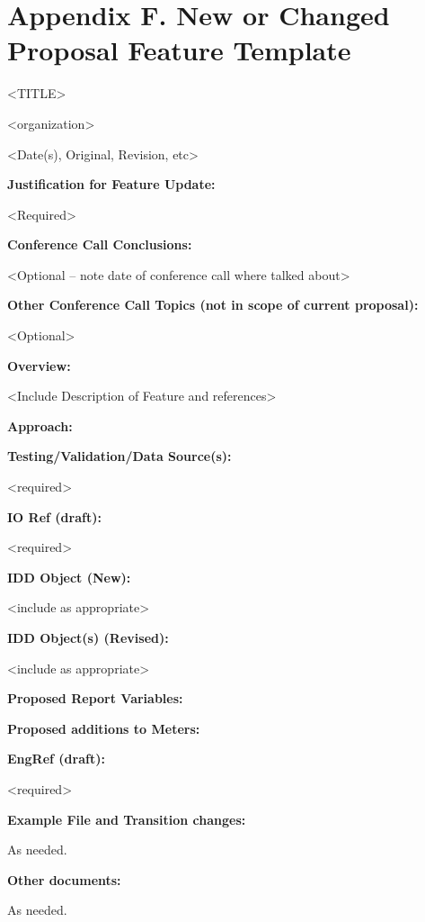 \chapter{Appendix F. New or Changed Proposal Feature Template}\label{appendix-f.-new-or-changed-proposal-feature-template}

\textless{}TITLE\textgreater{}

\textless{}organization\textgreater{}

\textless{}Date(s), Original, Revision, etc\textgreater{}

\textbf{Justification for Feature Update:}

\textless{}Required\textgreater{}

\textbf{Conference Call Conclusions:}

\textless{}Optional -- note date of conference call where talked about\textgreater{}

\textbf{Other Conference Call Topics (not in scope of current proposal):}

\textless{}Optional\textgreater{}

\textbf{Overview:}

\textless{}Include Description of Feature and references\textgreater{}

\textbf{Approach:}

\textbf{Testing/Validation/Data Source(s):}

\textless{}required\textgreater{}

\textbf{IO Ref (draft):}

\textless{}required\textgreater{}

\textbf{IDD Object (New):}

\textless{}include as appropriate\textgreater{}

\textbf{IDD Object(s) (Revised):}

\textless{}include as appropriate\textgreater{}

\textbf{Proposed Report Variables:}

\textbf{Proposed additions to Meters:}

\textbf{EngRef (draft):}

\textless{}required\textgreater{}

\textbf{Example File and Transition changes:}

As needed.

\textbf{Other documents:}

As needed.
